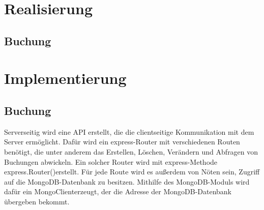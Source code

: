 \chapter{Realisierung}
\section{Buchung}



\chapter{Implementierung}

\section{Buchung}
Serverseitig wird eine API erstellt, die die clientseitige Kommunikation mit dem Server ermöglicht. Dafür wird ein express-Router mit verschiedenen Routen benötigt, die unter anderem das Erstellen, Löschen, Verändern und Abfragen von Buchungen abwickeln. Ein solcher Router wird mit express-Methode \glqq express.Router()\grqq \thinspace erstellt. Für jede Route wird es außerdem von Nöten sein, Zugriff auf die MongoDB-Datenbank zu besitzen. Mithilfe des MongoDB-Moduls wird dafür ein \glqq MongoClient\grqq \thinspace erzeugt, der die Adresse der MongoDB-Datenbank übergeben bekommt.

